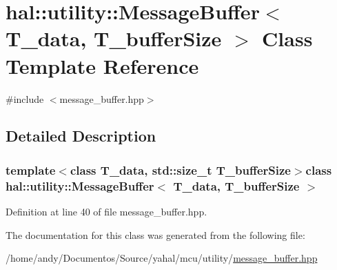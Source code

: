 \hypertarget{classhal_1_1utility_1_1_message_buffer}{}\section{hal\+:\+:utility\+:\+:Message\+Buffer$<$ T\+\_\+data, T\+\_\+buffer\+Size $>$ Class Template Reference}
\label{classhal_1_1utility_1_1_message_buffer}


{\ttfamily \#include $<$message\+\_\+buffer.\+hpp$>$}



\subsection{Detailed Description}
\subsubsection*{template$<$class T\+\_\+data, std\+::size\+\_\+t T\+\_\+buffer\+Size$>$class hal\+::utility\+::\+Message\+Buffer$<$ T\+\_\+data, T\+\_\+buffer\+Size $>$}



Definition at line 40 of file message\+\_\+buffer.\+hpp.



The documentation for this class was generated from the following file\+:\begin{DoxyCompactItemize}
\item 
/home/andy/\+Documentos/\+Source/yahal/mcu/utility/\hyperlink{message__buffer_8hpp}{message\+\_\+buffer.\+hpp}\end{DoxyCompactItemize}
